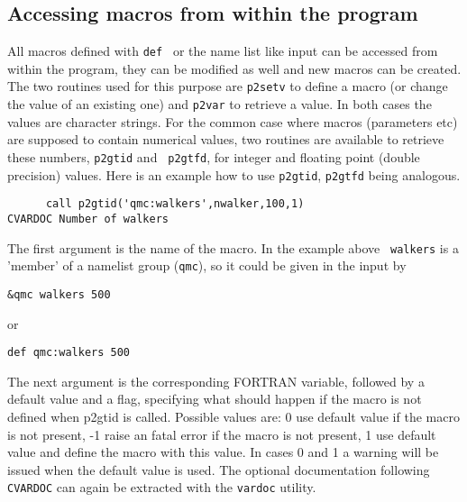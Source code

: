 \documentclass[a4paper]{article}
\begin{document}
\subsection{Accessing macros from within the program}
All macros defined with {\tt def } or the name list like input can be accessed
from within the program, they can be modified as well and new macros can be
created. The two routines used for this purpose are {\tt p2setv} to define a
macro (or change the value of an existing one) and {\tt p2var} to retrieve a
value. In both cases the values are character strings. For the common case
where macros (parameters etc) are supposed to contain numerical values, two
routines are available to retrieve these numbers, {\tt  p2gtid} and {\tt
p2gtfd}, for integer and floating point (double precision) values.
Here is an example how to use {\tt  p2gtid},  {\tt  p2gtfd} being analogous.
\begin{verbatim}
      call p2gtid('qmc:walkers',nwalker,100,1)
CVARDOC Number of walkers
\end{verbatim}
The first argument is the name of the macro. In the example above {\tt
walkers}  is a 'member' of
a namelist group ({\tt qmc}), so it could be given in the input by 
\begin{verbatim}
&qmc walkers 500
\end{verbatim}
or
\begin{verbatim}
def qmc:walkers 500
\end{verbatim}
The next argument is the corresponding FORTRAN variable, followed by a default
value and a flag, specifying what should happen if the macro is not defined
when p2gtid is called. Possible values are: 0 use default value if the macro
is not present, -1 raise an fatal error if the macro is not present, 1 use
default value and define the macro with this value. In cases 0 and 1 a
warning will be issued when the default value is used. 
The optional documentation following {\tt CVARDOC} can again be extracted with the 
{\tt vardoc} utility. 
 
\end{document}
